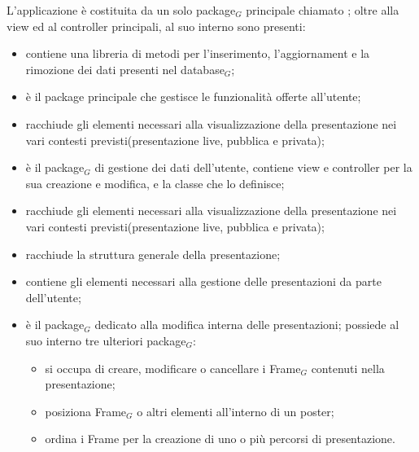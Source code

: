 L'applicazione è costituita da un solo package$_G$ principale chiamato ; oltre alla view ed al controller principali, al suo interno sono presenti:
\begin{itemize}
\item {} contiene una libreria di metodi per l'inserimento, l'aggiornament e la rimozione dei dati presenti nel database$_G$;
\item {} è il package principale che gestisce le funzionalità offerte all'utente;
\item {} racchiude gli elementi necessari alla visualizzazione della presentazione nei vari contesti previsti(presentazione live, pubblica e privata);
\item {} è il package$_G$ di gestione dei dati dell'utente, contiene view e controller per la sua creazione e modifica, e la classe che lo definisce;
\item {} racchiude gli elementi necessari alla visualizzazione della presentazione nei vari contesti previsti(presentazione live, pubblica e privata);
\item {} racchiude la struttura generale della presentazione;
\item {} contiene gli elementi necessari alla gestione delle presentazioni da parte dell'utente;
\item {} è il package$_G$ dedicato alla modifica interna delle presentazioni; possiede al suo interno tre ulteriori package$_G$:
\begin{itemize}
\item {} si occupa di creare, modificare o cancellare i Frame$_G$ contenuti nella presentazione;
\item {} posiziona Frame$_G$ o altri elementi all'interno di un poster;
\item {} ordina i Frame per la creazione di uno o più percorsi di presentazione.
\end{itemize}
\end{itemize}

\clearpage